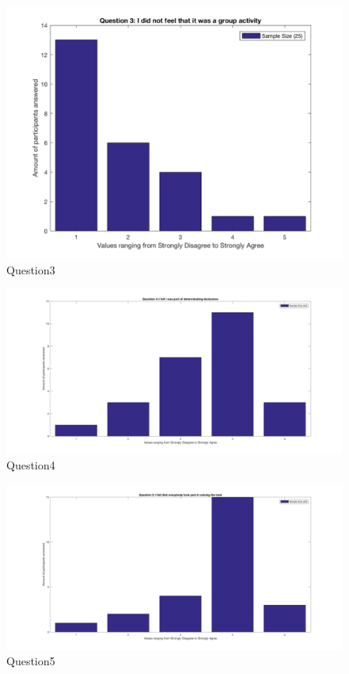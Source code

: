     \begin{figure}[H]
		\centering
		\includegraphics[width=0.9\linewidth]{figure/Appendices/Question3M} 
		\caption{Question3}
	\end{figure}

    \begin{figure}[H]
		\centering
		\includegraphics[width=0.9\linewidth]{figure/Appendices/Question4} 
		\caption{Question4}
	\end{figure}

    \begin{figure}[H]
		\centering
		\includegraphics[width=0.9\linewidth]{figure/Appendices/Question5} 
		\caption{Question5}
	\end{figure}

